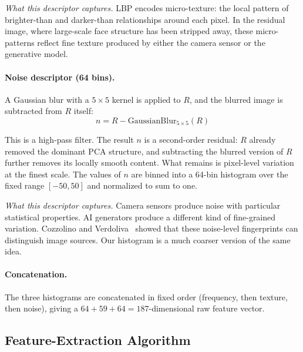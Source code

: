 \documentclass[runningheads]{llncs}
\begin{document}
\textit{What this descriptor captures.} LBP encodes micro-texture: the local pattern of brighter-than and darker-than relationships around each pixel. In the residual image, where large-scale face structure has been stripped away, these micro-patterns reflect fine texture produced by either the camera sensor or the generative model.

\paragraph{Noise descriptor (64 bins).} A Gaussian blur with a $5 \times 5$ kernel is applied to $R$, and the blurred image is subtracted from $R$ itself:
\begin{equation}
n = R - \mathrm{GaussianBlur}_{5 \times 5}(R)
\label{eq:noise}
\end{equation}

This is a high-pass filter. The result $n$ is a second-order residual: $R$ already removed the dominant PCA structure, and subtracting the blurred version of $R$ further removes its locally smooth content. What remains is pixel-level variation at the finest scale. The values of $n$ are binned into a 64-bin histogram over the fixed range $[-50, 50]$ and normalized to sum to one.

\textit{What this descriptor captures.} Camera sensors produce noise with particular statistical properties. AI generators produce a different kind of fine-grained variation. Cozzolino and Verdoliva~\cite{cozzolino2018} showed that these noise-level fingerprints can distinguish image sources. Our histogram is a much coarser version of the same idea.

\paragraph{Concatenation.} The three histograms are concatenated in fixed order (frequency, then texture, then noise), giving a $64 + 59 + 64 = 187$-dimensional raw feature vector.


\subsection{Feature-Extraction Algorithm}
\end{document}
